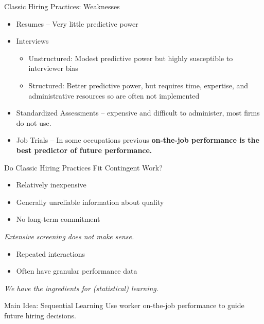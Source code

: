 \documentclass[10pt,aspectratio=169]{beamer}
\begin{document}
\begin{frame}{Classic Hiring Practices: Weaknesses}
\begin{itemize}
      \item Resumes  -- Very little \alert{predictive power} 
      \item Interviews
      \begin{itemize}
          \item Unstructured: Modest predictive power but highly susceptible to interviewer \alert{bias} 
          \item Structured: Better predictive power, but requires \alert{time}, \alert{expertise}, and \alert{administrative resources} so are often not implemented 
      \end{itemize}
      \item Standardized Assessments -- \alert{expensive} and \alert{difficult} to administer, most firms do not use. 
      \item Job Trials -- In some occupations previous \textbf{on-the-job performance is the best predictor of future performance.} 
    \end{itemize}
\end{frame}

\begin{frame}{Do Classic Hiring Practices Fit Contingent Work?}
    \begin{block}{}
    \begin{itemize}
        \item Relatively inexpensive
        \item Generally unreliable information about quality
        \item No long-term commitment
    \end{itemize}
    \end{block}
    \begin{center}
    \emph{Extensive screening does not make sense.}
    \end{center}
    
    \begin{block}{}
    \begin{itemize}
        \item Repeated interactions
        \item Often have granular performance data \parencite{Vincent2015}
    \end{itemize}
    \end{block}
    \begin{center}
    \emph{We have the ingredients for (statistical) learning.}
    \end{center}

    \begin{alertblock}{Main Idea: Sequential Learning}
        Use worker on-the-job performance to guide future hiring decisions.
    \end{alertblock}
\end{frame}
\end{document}

